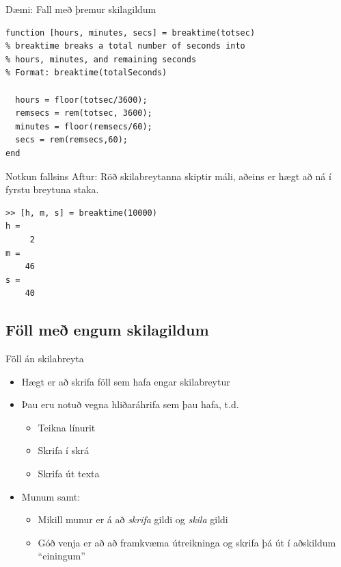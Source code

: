 \documentclass[handout]{beamer}
\begin{document}
\begin{frame}[fragile]{Dæmi: Fall með þremur skilagildum}
\vspace{\baselineskip}
\begin{verbatim}
function [hours, minutes, secs] = breaktime(totsec)
% breaktime breaks a total number of seconds into
% hours, minutes, and remaining seconds
% Format: breaktime(totalSeconds)

  hours = floor(totsec/3600);
  remsecs = rem(totsec, 3600);
  minutes = floor(remsecs/60);
  secs = rem(remsecs,60);
end
\end{verbatim}
\end{frame}

\begin{frame}[fragile]{Notkun fallsins}
Aftur: Röð skilabreytanna skiptir máli, aðeins er hægt að ná í fyrstu breytuna staka.
\begin{verbatim}
>> [h, m, s] = breaktime(10000)
h =
     2
m =
    46
s =
    40
\end{verbatim}

\end{frame}

\subsection{Föll með engum skilagildum}

\begin{frame}{Föll án skilabreyta}
\begin{itemize}
 \item Hægt er að skrifa föll sem hafa engar skilabreytur
 \item Þau eru notuð vegna hliðaráhrifa sem þau hafa, t.d.
 \begin{itemize}
  \item Teikna línurit
  \item Skrifa í skrá 
  \item Skrifa út texta \pause
 \end{itemize}
 \item Munum samt:
  \begin{itemize}
  \item Mikill munur er á að \emph{skrifa} gildi og \emph{skila} gildi
  \item Góð venja er að að framkvæma útreikninga og skrifa þá út í aðskildum ``einingum''
 \end{itemize}
\end{itemize}
\end{frame}
\end{document}
